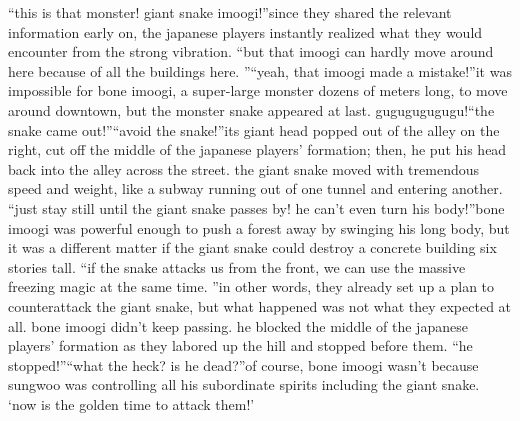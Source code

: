 “this is that monster! giant snake imoogi!”since they shared the relevant information early on, the japanese players instantly realized what they would encounter from the strong vibration.
“but that imoogi can hardly move around here because of all the buildings here.
”“yeah, that imoogi made a mistake!”it was impossible for bone imoogi, a super-large monster dozens of meters long, to move around downtown, but the monster snake appeared at last.
gugugugugugu!“the snake came out!”“avoid the snake!”its giant head popped out of the alley on the right, cut off the middle of the japanese players’ formation; then, he put his head back into the alley across the street.
the giant snake moved with tremendous speed and weight, like a subway running out of one tunnel and entering another.
“just stay still until the giant snake passes by! he can’t even turn his body!”bone imoogi was powerful enough to push a forest away by swinging his long body, but it was a different matter if the giant snake could destroy a concrete building six stories tall.
“if the snake attacks us from the front, we can use the massive freezing magic at the same time.
”in other words, they already set up a plan to counterattack the giant snake, but what happened was not what they expected at all.
bone imoogi didn’t keep passing.
 he blocked the middle of the japanese players’ formation as they labored up the hill and stopped before them.
“he stopped!”“what the heck? is he dead?”of course, bone imoogi wasn’t because sungwoo was controlling all his subordinate spirits including the giant snake.
‘now is the golden time to attack them!’

 